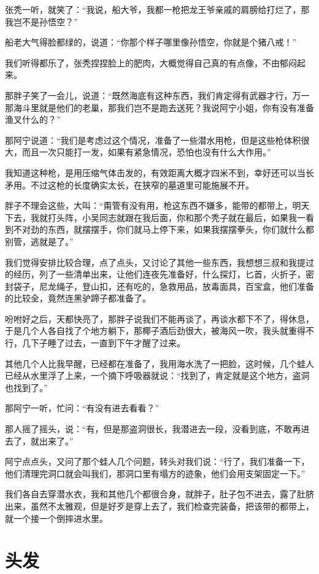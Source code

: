 张秃一听，就笑了：“我说，船大爷，我都一枪把龙王爷亲戚的肩膀给打烂了，那我岂不是孙悟空？”

船老大气得脸都绿的，说道：“你那个样子哪里像孙悟空，你就是个猪八戒！”

我们听得都乐了，张秃捏捏脸上的肥肉，大概觉得自己真的有点像，不由郁闷起来。

那胖子笑了一会儿，说道：“既然海底有这种东西，我们肯定得有武器才行，万一那海斗里就是他们的老巢，那我们岂不是跑去送死？我说阿宁小姐，你有没有准备渔叉什么的？”

那阿宁说道：“我们是考虑过这个情况，准备了一些潜水用枪，但是这些枪体积很大，而且一次只能打一发，如果有紧急情况，恐怕也没有什么大作用。”

我知道这种枪，是用压缩气体击发的，有效距离大概才四米不到，幸好还可以当长矛用。不过这枪的长度确实太长，在狭窄的墓道里可能施展不开。

胖子不理会这些，大叫：“甭管有没有用，枪这东西不嫌多，能带的都带上，明天下去，我就打头阵，小吴同志就跟在我后面，你和那个秃子就在最后，如果我一看到不对劲的东西，就摆摆手，你们就马上停下来，如果我摆摆拳头，你们就什么都别管，逃就是了。”

我们觉得安排比较合理，点了点头，又讨论了其他一些东西，我想想三叔和我提过的经历，列了一些清单出来，让他们连夜先准备好，什么探灯，匕首，火折子，密封袋子，尼龙绳子，登山扣，还有吃的，急救用品，放毒面具，百宝盒，他们准备的比较全，竟然连黑驴蹄子都准备了。

吩咐好之后，天都快亮了，那胖子说我们不能再谈了，再谈水都下不了，得休息，于是几个人各自找了个地方躺下，那椰子酒后劲很大，被海风一吹，我头就重得不行，几下子睡了过去，一直到下午才醒了过来。

其他几个人比我早醒，已经都在准备了，我用海水洗了一把脸，这时候，几个蛙人已经从水里浮了上来，一个摘下呼吸器就说：“找到了，肯定就是这个地方，盗洞也找到了。”

那阿宁一听，忙问：“有没有进去看看？”

那人摇了摇头，说：“有，但是那盗洞很长，我潜进去一段，没看到底，不敢再进去了，就出来了。”

阿宁点点头，又问了那个蛙人几个问题，转头对我们说：“行了，我们准备一下，他们清理完洞口就会叫我们，那洞口里有塌方的迹象，他们会用支架固定一下。”

我们各自去穿潜水衣，我和其他几个都很合身，就胖子，肚子包不进去，露了肚脐出来，虽然不太雅观，但是好歹是穿上去了，我们检查完装备，把该带的都带上，就一个接一个倒摔进水里。

\chapter{头发}

